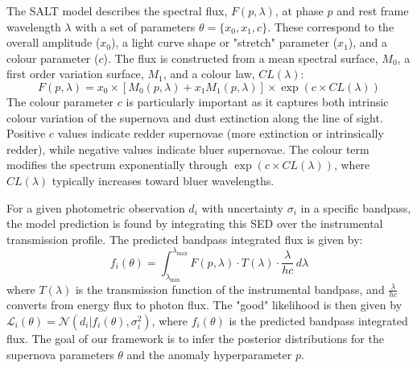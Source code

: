 The SALT model describes the spectral flux, $F(p, \lambda)$, at phase $p$ and rest frame wavelength $\lambda$ with a set of parameters $\theta = \{x_0, x_1, c\}$. These correspond to the overall amplitude ($x_0$), a light curve shape or "stretch" parameter ($x_1$), and a colour parameter ($c$). The flux is constructed from a mean spectral surface, $M_0$, a first order variation surface, $M_1$, and a colour law, $CL(\lambda)$:
\begin{equation}
\label{eq:salt_flux}
    F(p, \lambda) = x_0 \times [M_0(p, \lambda) + x_1 M_1(p, \lambda)] \times \exp(c \times CL(\lambda))
\end{equation}
The colour parameter $c$ is particularly important as it captures both intrinsic colour variation of the supernova and dust extinction along the line of sight. Positive $c$ values indicate redder supernovae (more extinction or intrinsically redder), while negative values indicate bluer supernovae. The colour term modifies the spectrum exponentially through $\exp(c \times CL(\lambda))$, where $CL(\lambda)$ typically increases toward bluer wavelengths.

For a given photometric observation $d_i$ with uncertainty $\sigma_i$ in a specific bandpass, the model prediction is found by integrating this SED over the instrumental transmission profile. The predicted bandpass integrated flux is given by:
\begin{equation}
    f_i(\theta) = \int_{\lambda_{\mathrm{min}}}^{\lambda_{\mathrm{max}}} F(p, \lambda) \cdot T(\lambda) \cdot \frac{\lambda}{hc} \, d\lambda
\end{equation}
where $T(\lambda)$ is the transmission function of the instrumental bandpass, and $\frac{\lambda}{hc}$ converts from energy flux to photon flux. The "good" likelihood is then given by $\mathcal{L}_i(\theta) = \mathcal{N}(d_i | f_i(\theta), \sigma_i^2)$, where $f_i(\theta)$ is the predicted bandpass integrated flux. The goal of our framework is to infer the posterior distributions for the supernova parameters $\theta$ and the anomaly hyperparameter $p$.
